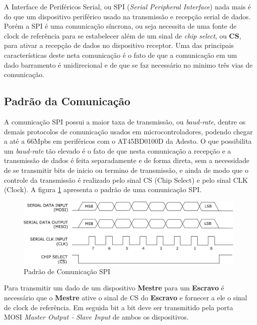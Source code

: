 A Interface de Periféricos Serial, ou SPI (\emph{Serial Peripheral Interface}) nada mais é do que um dispositivo periférico usado na transmissão e recepção serial de dados. Porém a SPI é uma comunicação síncrona, ou seja necessita de uma fonte de clock de referência para se estabelecer além de um sinal de \emph{chip select}, ou \textbf{CS}, para ativar a recepção de dados no dispositivo receptor. Uma das principais características deste neta comunicação é o fato de que a comunicação em um dado barramento é unidirecional e de que se faz necessário no minimo três vias de comunicação.

\subsection{Padrão da Comunicação}

A comunicação SPI possui a maior taxa de transmissão, ou \emph{baud-rate}, dentre os demais protocolos de comunicação usados em microcontroladores, podendo chegar a até a 66Mpbs em periféricos com o AT45BD0100D da Adesto. O que possibilita um  \emph{baud-rate} tão elevado é o fato de que nesta comunicação a recepção e a transmissão de dados é feita separadamente e de forma direta, sem a necessidade de se transmitir bits de inicio ou termino de transmissão, e ainda de modo que o controle da transmissão é realizado pelo sinal CS (Chip Select) e pelo sinal  CLK (Clock).  A figura \ref{fig:SPI} apresenta o padrão de uma comunicação SPI.

\begin{figure}[H]
	\centering
	\includegraphics[width=1\textwidth] {figuras/PadraoSPI.eps}
	\caption{Padrão de Comunicação SPI}
	\label{fig:SPI}
\end{figure}

Para transmitir um dado de um dispositivo \textbf{Mestre} para um \textbf{Escravo} é necessário que o \textbf{Mestre} ative o sinal de CS do \textbf{Escravo} e fornecer a ele o sinal de clock de referência. Em seguida bit a bit deve ser transmitido pela porta MOSI \emph{Master Output - Slave Input} de ambos os dispositivos. 

